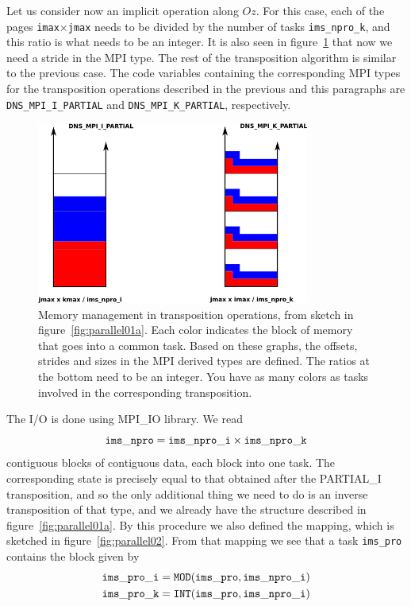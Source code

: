 Let us consider now an implicit operation along $Oz$. For this case, each of the
pages {\tt imax}$\times${\tt jmax} needs to be divided by the number of tasks
{\tt ims\_npro\_k}, and this ratio is what needs to be an integer. It is also
seen in figure~\ref{fig:parallel01b} that now we need a stride in the MPI
type. The rest of the transposition algorithm is similar to the previous
case. The code variables containing the corresponding MPI types for the
transposition operations described in the previous and this paragraphs are {\tt
DNS\_MPI\_I\_PARTIAL} and {\tt DNS\_MPI\_K\_PARTIAL}, respectively.

\begin{figure}[!ht]
\begin{centering}
\includegraphics[width=0.8\textwidth]{figs/parallel01b.png}
\caption{Memory management in transposition operations, from sketch in
  figure~\ref{fig:parallel01a}. Each color indicates the block of memory that
  goes into a common task. Based on these graphs, the offsets, strides and sizes
  in the MPI derived types are defined. The ratios at the bottom need to be an
  integer. You have as many colors as tasks involved in the corresponding
  transposition.}
\label{fig:parallel01b}
\end{centering}
\end{figure}

The I/O is done using MPI\_IO library. We read 
\begin{equation*}
{\tt ims\_npro}={\tt ims\_npro\_i} \times {\tt ims\_npro\_k} 
\end{equation*}
contiguous blocks of contiguous data, each block into one task. The
corresponding state is precisely equal to that obtained after the PARTIAL\_I
transposition, and so the only additional thing we need to do is an inverse
transposition of that type, and we already have the structure described in
figure~\ref{fig:parallel01a}. By this procedure we also defined the mapping,
which is sketched in figure~\ref{fig:parallel02}. From that mapping we see that
a task {\tt ims\_pro} contains the block given by
\begin{eqnarray*}
&{\tt ims\_pro\_i} = {\tt MOD(ims\_pro,ims\_npro\_i)}\\
&{\tt ims\_pro\_k} = {\tt INT(ims\_pro,ims\_npro\_i)}
\end{eqnarray*}

